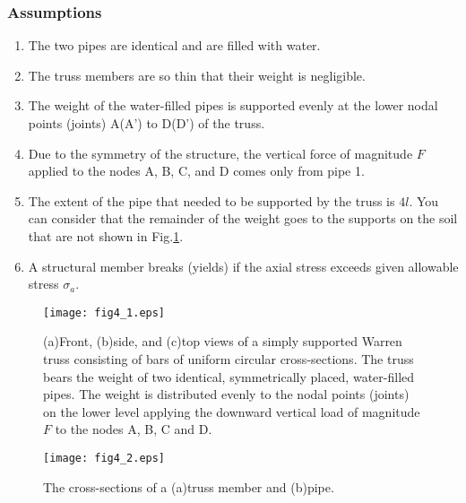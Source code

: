 \documentclass[10pt,a4j]{article}
\begin{document}
\subsubsection{Assumptions}
\begin{enumerate}
\item
	The two pipes are identical and are filled with water. 
\item
	The truss members are so thin that their weight is negligible.
\item
	The weight of the water-filled pipes is supported evenly at the lower nodal 
		points (joints) A(A') to D(D') of the truss.
\item
	Due to the symmetry of the structure, the vertical force of magnitude 
	$F$ applied to the nodes A, B, C, and D comes only from pipe 1.
\item
	The extent of the pipe that needed to be supported by the truss is $4l$. 
	You can consider that the remainder of the weight goes to the supports on the 
	soil that are not shown in Fig.\ref{fig:fig4_1}.
\item
	A structural member breaks (yields) if the axial stress exceeds given allowable stress $\sigma_a$.
\end{enumerate}
\begin{figure}
	\begin{center}
	\texttt{[image: fig4\_1.eps]} 
	\end{center}
	\caption{
		(a)Front, (b)side, and (c)top views of a simply supported Warren truss consisting 
		of bars of uniform circular cross-sections. 
		The truss bears the weight of two identical, symmetrically placed, water-filled pipes.
		The weight is distributed evenly to the nodal points (joints) on the lower level 
		applying the downward vertical load of magnitude $F$ to the nodes A, B, C and D.
	}
	\label{fig:fig4_1}
\end{figure}
\begin{figure}
	\begin{center}
	\texttt{[image: fig4\_2.eps]} 
	\end{center}
	\caption{
		The cross-sections of a (a)truss member and (b)pipe.  
	}
	\label{fig:fig4_2}
\end{figure}
\end{document}
